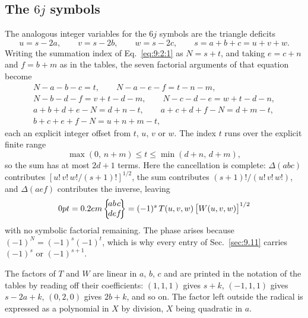 \subsection{The $6j$ symbols}\label{sec:14.2.2}
The analogous integer variables for the $6j$ symbols are the triangle deficits
\begin{equation}
u=s-2a, \qquad v=s-2b, \qquad w=s-2c, \qquad s=a+b+c=u+v+w .\label{eq:14:2:4}
\end{equation}
Writing the summation index of Eq.~\eqref{eq:9:2:1} as $N=s+t$, and taking
$e=c+n$ and $f=b+m$ as in the tables, the seven factorial arguments of that
equation become
\begin{equation}
\begin{gathered}
N-a-b-c=t, \qquad N-a-e-f=t-n-m, \\
N-b-d-f=v+t-d-m, \qquad N-c-d-e=w+t-d-n, \\
a+b+d+e-N=d+n-t, \qquad a+c+d+f-N=d+m-t, \\
b+c+e+f-N=u+n+m-t ,
\end{gathered}\label{eq:14:2:5}
\end{equation}
each an explicit integer offset from $t$, $u$, $v$ or $w$. The index $t$ runs
over the explicit finite range
\begin{equation}
\max(0,\,n+m) \leq t \leq \min(d+n,\,d+m),\label{eq:14:2:6}
\end{equation}
so the sum has at most $2d+1$ terms. Here the cancellation is complete:
$\Delta(abc)$ contributes $[u!\,v!\,w!/(s+1)!]^{1/2}$, the sum contributes
$(s+1)!/(u!\,v!\,w!)$, and $\Delta(aef)$ contributes the inverse, leaving
\begin{equation}
\sixj{a}{b}{c}{d}{e}{f}=(-1)^{s}\,T(u,v,w)\,\bigl[W(u,v,w)\bigr]^{1/2}
\label{eq:14:2:7}
\end{equation}
with no symbolic factorial remaining. The phase arises because
$(-1)^{N}=(-1)^{s}(-1)^{t}$, which is why every entry of Sec.~\ref{sec:9.11}
carries $(-1)^{s}$ or $(-1)^{s+1}$.

The factors of $T$ and $W$ are linear in $a$, $b$, $c$ and are printed in the
notation of the tables by reading off their coefficients: $(1,1,1)$ gives
$s+k$, $(-1,1,1)$ gives $s-2a+k$, $(0,2,0)$ gives $2b+k$, and so on. The factor
left outside the radical is expressed as a polynomial in $X$ by division, $X$
being quadratic in $a$.

